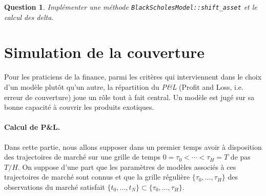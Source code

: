 \documentclass[a4paper,11pt]{article}
\def\var#1{{\tt #1}}
\newtheorem{question}{Question}
\begin{document}

\begin{question}
  Implémenter une méthode \var{BlackScholesModel::shift\_asset} et le calcul des delta.
\end{question}


\section{Simulation de la couverture}
\label{couverture}

Pour les praticiens de la finance, parmi les critères qui interviennent dans le
choix d'un modèle plutôt qu'un autre, la répartition du {\it P\&L} (Profit and
Loss, i.e. erreur de couverture) joue un rôle tout à fait central. Un modèle est
jugé sur sa bonne capacité à couvrir les produits exotiques.

\paragraph{Calcul de P\&L.}

Dans cette partie, nous allons supposer dans un premier temps avoir à disposition des
trajectoires de marché sur une grille de temps $0 = \tau_0 < \cdots < \tau_H = T$ de pas
$T/H$. On suppose d'une part que les paramètres de modèles associés à ces trajectoires de
marché sont connus et que la grille régulière $\{\tau_0, \dots, \tau_H \}$ des
observations du marché satisfait $\{t_0, \dots, t_N\} \subset \{\tau_0, \dots, \tau_H \}$.
\end{document}
